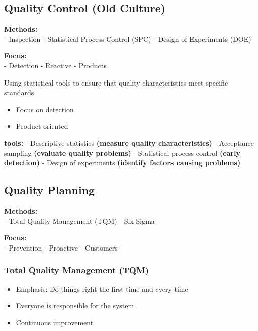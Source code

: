 \documentclass[11pt]{article}
\providecommand{\tightlist}{%
      \setlength{\itemsep}{0pt}\setlength{\parskip}{0pt}}
\begin{document}
\hypertarget{quality-control-old-culture}{%
\subsection{Quality Control (Old
Culture)}\label{quality-control-old-culture}}

\textbf{Methods:}\\
- Inspection - Statistical Process Control (SPC) - Design of Experiments
(DOE)

\textbf{Focus:}\\
- Detection - Reactive - Products

Using statistical tools to ensure that quality characteristics meet
specific standards

\begin{itemize}
\tightlist
\item
  Focus on detection
\item
  Product oriented
\end{itemize}

\textbf{tools:} - Descriptive statistics \textbf{(measure quality
characteristics)} - Acceptance sampling \textbf{(evaluate quality
problems)} - Statistical process control \textbf{(early detection)} -
Design of experiments \textbf{(identify factors causing problems)}

\hypertarget{quality-planning}{%
\subsection{Quality Planning}\label{quality-planning}}

\textbf{Methods:}\\
- Total Quality Management (TQM) - Six Sigma

\textbf{Focus:}\\
- Prevention - Proactive - Customers

\hypertarget{total-quality-management-tqm}{%
\subsubsection{Total Quality Management
(TQM)}\label{total-quality-management-tqm}}

\begin{itemize}
\tightlist
\item
  Emphasis: Do things right the first time and every time
\item
  Everyone is responsible for the system
\item
  Continuous improvement
\end{itemize}
\end{document}
